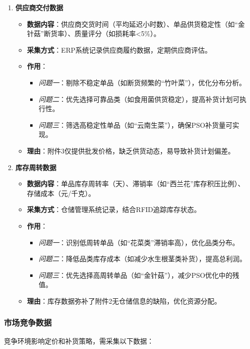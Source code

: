 \documentclass{cumcmthesis} %
\begin{document}
\begin{enumerate}
\item \textbf{供应商交付数据}
\begin{itemize}
\item \textbf{数据内容}：供应商交货时间（平均延迟小时数）、单品供货稳定性（如“金针菇”断货率）、质量评分（如损耗率<5\%）。
\item \textbf{采集方式}：ERP系统记录供应商履约数据，定期供应商评估。
\item \textbf{作用}：
\begin{itemize}
\item \textit{问题一}：剔除不稳定单品（如断货频繁的“竹叶菜”），优化分布分析。
\item \textit{问题二}：优先选择可靠品类（如食用菌供货稳定），提高补货计划可执行性。
\item \textit{问题三}：筛选高稳定性单品（如“云南生菜”），确保PSO补货量可实现。
\end{itemize}
\item \textbf{理由}：附件3仅提供批发价格，缺乏供货动态，易导致补货计划偏差。
\end{itemize}

\item \textbf{库存周转数据}
\begin{itemize}
\item \textbf{数据内容}：单品库存周转率（天）、滞销率（如“西兰花”库存积压比例）、存储成本（元/千克）。
\item \textbf{采集方式}：仓储管理系统记录，结合RFID追踪库存状态。
\item \textbf{作用}：
\begin{itemize}
\item \textit{问题一}：识别低周转单品（如“花菜类”滞销率高），优化品类分布。
\item \textit{问题二}：降低品类库存成本（如减少水生根茎类补货），提高总利润。
\item \textit{问题三}：优先选择高周转单品（如“金针菇”），减少PSO优化中的残值。
\end{itemize}
\item \textbf{理由}：库存数据弥补了附件2无仓储信息的缺陷，优化资源分配。
\end{itemize}
\end{enumerate}

\subsubsection{市场竞争数据}

竞争环境影响定价和补货策略，需采集以下数据：
\end{document}
